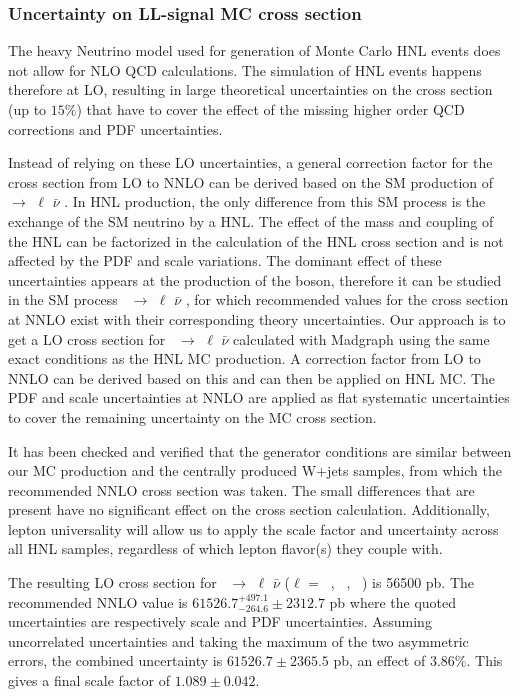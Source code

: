 \subsubsection{Uncertainty on LL-signal MC cross section}\label{sec:c4lo}
The heavy Neutrino model used for generation of Monte Carlo HNL events does not allow for NLO QCD calculations. The simulation of HNL events happens therefore at LO, resulting in large theoretical uncertainties on the cross section (up to $15\%$) that have to cover the effect of the missing higher order QCD corrections and PDF uncertainties.

Instead of relying on these LO uncertainties, a general correction factor for the cross section from LO to NNLO can be derived based on the SM production of \PW\ $\rightarrow$ $\ell$ $\bar{\nu}$ . In HNL production, the only difference from this SM process is the exchange of the SM neutrino by a HNL. The effect of the mass and coupling of the HNL can be factorized in the calculation of the HNL cross section and is not affected by the PDF and scale variations. The dominant effect of these uncertainties appears at the production of the \PW boson, therefore it can be studied in the SM process \PW\ $\rightarrow$ $\ell$ $\bar{\nu}$ , for which recommended values for the cross section at NNLO exist with their corresponding theory uncertainties. Our approach is to get a LO cross section for \PW\ $\rightarrow$ $\ell$ $\bar{\nu}$ calculated with Madgraph using the same exact conditions as the HNL MC production. A correction factor from LO to NNLO can be derived based on this and can then be applied on HNL MC. The PDF and scale uncertainties at NNLO are applied as flat systematic uncertainties to cover the remaining uncertainty on the MC cross section.

It has been checked and verified that the generator conditions are similar between our MC production and the centrally produced W+jets samples, from which the recommended NNLO cross section was taken. The small differences that are present have no significant effect on the cross section calculation. Additionally, lepton universality will allow us to apply the scale factor and uncertainty across all HNL samples, regardless of which lepton flavor(s) they couple with.

The resulting LO cross section for \PW\ $\rightarrow$ $\ell$
$\bar{\nu}$ ($\ell$ = \Pe\ , \PGm\ , \PGt\ ) is 56500 pb. The recommended NNLO value is $61526.7^{+497.1}_{-264.6}\pm 2312.7$ pb where the quoted uncertainties are respectively scale and PDF uncertainties. Assuming uncorrelated uncertainties and taking the maximum of the two asymmetric errors, the combined uncertainty is $61526.7 \pm 2365.5$ pb, an effect of $3.86\%$. This gives a final scale factor of $1.089 \pm 0.042$.

